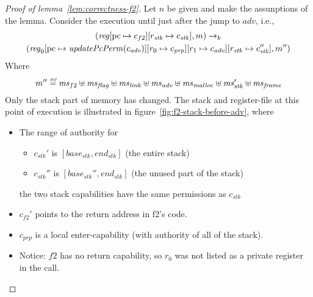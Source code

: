 \documentclass[a4paper]{article}
\newcommand{\update}[2]{[#1 \mapsto #2]}
\newcommand{\defeq}{\stackrel{\textit{\tiny{def}}}{=}}
\newcommand{\var}[1]{\mathit{#1}}
\newcommand{\hs}{\var{ms}}
\newcommand{\ms}{\hs}
\newcommand{\pcreg}{\mathrm{pc}}
\newcommand{\start}{\var{base}}
\newcommand{\addrend}{\var{end}}
\newcommand{\reg}{\var{reg}}
\newcommand{\adv}{\var{adv}}
\newcommand{\link}{\var{link}}
\newcommand{\stk}{\var{stk}}
\newcommand{\flag}{\var{flag}}
\newcommand{\plainfun}[2]{
  \ifthenelse{\equal{#2}{}}
  {\mathit{#1}}
  {\mathit{#1}(#2)}
}
\newcommand{\updatePcPerm}[1]{\plainfun{updatePcPerm}{#1}}
\newcommand{\codelabel}[1]{\mathit{#1}}
\newcommand{\malloc}{\codelabel{malloc}}
\newcommand{\step}[1][]{\rightarrow_{#1}}
\begin{document}
\begin{proof}[Proof of lemma~\ref{lem:correctness-f2}]
  Let $n$ be given and make the assunptions of the lemma. Consider the execution until just after the jump to $\adv$, i.e.,
  \begin{multline*}
    (\reg\update{\pcreg}{c_{f2}}\update{r_\stk}{c_\stk},m) \step[k] \\
    (\reg_0\update{\pcreg}{\updatePcPerm{c_\adv}}\update{r_0}{c_{\var{prp}}}\update{r_1}{c_\adv}\update{r_\stk}{c_\stk''},m'')
  \end{multline*}
  Where 
  \[
    m''  \defeq \hs_{f2} \uplus 
    \hs_\flag \uplus                
    \ms_\link \uplus 
    \hs_\adv \uplus 
    \ms_\malloc \uplus 
    \ms_\stk' \uplus
    \ms_{\var{frame}}
  \]
  Only the stack part of memory has changed. The stack and register-file at this point of execution is illustrated in figure~\ref{fig:f2-stack-before-adv}, where
  \begin{itemize}
  \item The range of authority for 
    \begin{itemize}
    \item $c_\stk'$ is $[\start_\stk,\addrend_\stk]$ (the entire stack)
    \item $c_\stk''$ is $[\start_\stk'',\addrend_\stk]$ (the unused part of the stack)
    \end{itemize}
    the two stack capabilities have the same permissions as $c_\stk$
  \item $c_{f2}'$ points to the return address in f2's code.
  \item $c_{\var{prp}}$ is a local enter-capability (with authority of all of the stack).
  \item Notice: $f2$ has no return capability, so $r_0$ was not listed as a private register in the call.
  \end{itemize}


\end{proof}
\end{document}
